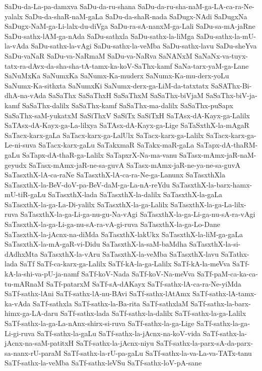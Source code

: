 {SaDu-da-La-pa-damxva
SaDu-da-ru-shana
SaDu-da-ru-sha-naM-ga-LA-ca-ra-Ne-yalalx
SaDu-da-shaR-naM-gaLa
SaDu-da-shaR-nada
SaDugx-NAdi
SaDugxNa
SaDugx-NaM-ga-Li-lalx-du-diVga
SaDu-ra-sA-nanxM-ga-Lali
SaDu-sa-mA-jaRne
SaDu-sathx-lAM-ga-nAda
SaDu-sathxla
SaDu-sathx-la-liMga
SaDu-sathx-la-mU-la-vAda
SaDu-sathx-la-vAgi
SaDu-sathx-la-veMba
SaDu-sathx-lavu
SaDu-sheYva
SaDu-vaNaR
SaDu-va-NaRmaM
SaDu-va-NaRva
SaNANxM
SaNaNx-va-tuyx-tatx-ra-dAvx-da-sha-sha-tA-tamx-ka-koV-SaThx-kamf
SaNa-tarx-yaM-ga-Lane
SaNuMxKa
SaNumxKa
SaNumx-Ka-muderx
SaNumx-Ka-mu-derx-yoLu
SaNumx-Ka-sithxta
SaNumxKi
SaNumx-derx-ga-LiM-da-tatxtatx
SaSAThx-Bi-dhA-na-vAda
SaSaThx
SaSaThxH
SaSaThxM
SaSaThx-biVjaM
SaSaThx-biV-ja-kamf
SaSaThx-dalilx
SaSaThx-kamf
SaSaThx-ma-dalilx
SaSaThx-puSapx
SaSaThx-saM-yukatxM
SaSiThxV
SaSiTx
SaSiTxH
SaTAsx-dA-Kayx-ga-Lalilx
SaTAsx-dA-Kayx-ga-La-lilxya
SaTAsx-dA-Kayx-ga-Lige
SaTaSxthX-la-mAgaR
SaTacx-karx-gaLa
SaTacx-karx-ga-LalUlx
SaTacx-karx-ga-Lalilx
SaTacx-karx-ga-Le-ni-suva
SaTacx-karx-gaLu
SaTakxmaR
SaTakx-maR-gaLa
SaTapx-dA-thaRM-gaLu
SaTapx-dA-thaR-ga-Lalilx
SaTapxrX-Na-ma-vanu
SaTasx-mAmx-jaR-naM-geyudx
SaTasx-mAmx-jaR-ne-sa-guvA
SaTasx-mAmx-jaR-ne-ya-ne-sa-guvA
SaTasxthX-lA-ca-raNe
SaTasxthX-lA-ca-ra-Ne-ga-Lanunx
SaTasxthXla
SaTasxthX-la-BeV-doV-pa-BeV-daM-ga-La-nA-reYdu
SaTasxthX-la-barx-hamx-mU-tiR-gaLu
SaTasxthX-lada
SaTasxthX-la-dalilx
SaTasxthX-la-gaLa
SaTasxthX-la-ga-La-Di-yalilx
SaTasxthX-la-ga-Lalilx
SaTasxthX-la-ga-La-lilx-ruva
SaTasxthX-la-ga-Li-ga-nu-gu-Na-vAgi
SaTasxthX-la-ga-Li-ga-nu-sA-ra-vAgi
SaTasxthX-la-ga-Li-ga-nu-sA-ra-vA-gi-ruva
SaTasxthX-la-ga-Lo-Dane
SaTasxthX-la-jAcnx-na-diMda
SaTasxthX-lakUkx
SaTasxthX-la-liM-ga-gaLa
SaTasxthX-la-mA-gaR-vi-Didu
SaTasxthX-la-saM-baMdha
SaTasxthX-la-si-dAdhxMta
SaTasxthX-la-vAru
SaTasxthX-la-veMba
SaTasxthX-lavu
SaTathx-lada
SaTf
SaTf-ca-karx-ga-Lalilx
SaTf-kA-la-ga-Lalilx
SaTf-kA-la-meVva
SaTf-kA-la-shi-va-pU-ja-namf
SaTf-koV-Nada
SaTf-koV-Na-meVva
SaTf-paM-ca-ka-ca-tu-mARnaM
SaTf-patarxM
SaTf-sA-dAKayx
SaTf-sathx-lA-ca-ra-Ne-yiMda
SaTf-sathx-lAni
SaTf-sathx-lA-nu-BAvi
SaTf-sathx-lAtAmx
SaTf-sathx-lA-tamx-ka-vAda
SaTf-sathxla
SaTf-sathx-la-Ba-rita
SaTf-sathxlaM
SaTf-sathx-la-barx-himx-ga-LA-daru
SaTf-sathx-lada
SaTf-sathx-la-dalilx
SaTf-sathx-la-ga-Lalilx
SaTf-sathx-la-ga-La-nAnx-shirx-si-ruva
SaTf-sathx-la-ga-Lige
SaTf-sathx-la-ga-Li-gi-ruva
SaTf-sathx-la-gaLu
SaTf-sathx-la-jAcnx-na-koV-vida
SaTf-sathx-la-jAcnx-na-saM-patitxH
SaTf-sathx-la-jAcnx-niyu
SaTf-sathx-la-parx-sA-da-parx-sa-nanx-rU-paraM
SaTf-sathx-la-rU-pa-gaLu
SaTf-sathx-la-va-La-va-TATx-tanu
SaTf-sathx-la-veMba
SaTf-sathx-leVSu
SaTf-sathx-loV-pA-sane
}
